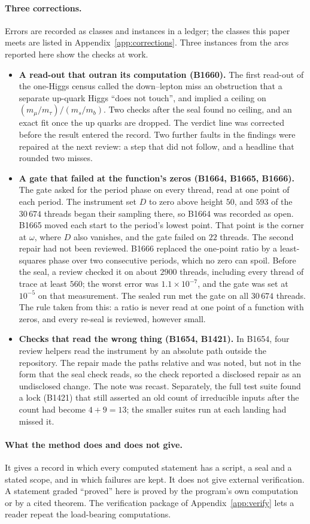 \paragraph{Three corrections.}
Errors are recorded as classes and instances in a ledger; the classes this paper meets are listed in
Appendix~\ref{app:corrections}. Three instances from the arcs reported here show the checks at work.
\begin{itemize}
\item \textbf{A read-out that outran its computation (B1660).} The first read-out of the one-Higgs census called the
  down--lepton miss an obstruction that a separate up-quark Higgs ``does not touch'', and implied a ceiling on
  $(m_\mu/m_\tau)/(m_s/m_b)$. Two checks after the seal found no ceiling, and an exact fit once the up quarks are
  dropped. The verdict line was corrected before the result entered the record. Two further faults in the findings
  were repaired at the next review: a step that did not follow, and a headline that rounded two misses.
\item \textbf{A gate that failed at the function's zeros (B1664, B1665, B1666).} The gate asked for the period phase on
  every thread, read at one point of each period. The instrument set $D$ to zero above height $50$, and $593$ of the
  $30\,674$ threads began their sampling there, so B1664 was recorded as open. B1665 moved each start to the period's
  lowest point. That point is the corner at $\omega$, where $D$ also vanishes, and the gate failed on $22$ threads. The
  second repair had not been reviewed. B1666 replaced the one-point ratio by a least-squares phase over two consecutive
  periods, which no zero can spoil. Before the seal, a review checked it on about $2900$ threads, including every
  thread of trace at least $560$; the worst error was $1.1\times10^{-7}$, and the gate was set at $10^{-5}$ on that
  measurement. The sealed run met the gate on all $30\,674$ threads. The rule taken from this: a ratio is never read at
  one point of a function with zeros, and every re-seal is reviewed, however small.
\item \textbf{Checks that read the wrong thing (B1654, B1421).} In B1654, four review helpers read the instrument by an
  absolute path outside the repository. The repair made the paths relative and was noted, but not in the form that
  the seal check reads, so the check reported a disclosed repair as an undisclosed change. The note was recast. Separately, the
  full test suite found a lock (B1421) that still asserted an old count of irreducible inputs after the count had
  become $4+9=13$; the smaller suites run at each landing had missed it.
\end{itemize}

\paragraph{What the method does and does not give.}
It gives a record in which every computed statement has a script, a seal and a stated scope, and in which failures are
kept. It does not give external verification. A statement graded ``proved'' here is proved by the program's own
computation or by a cited theorem. The verification package of Appendix~\ref{app:verify} lets a reader repeat the
load-bearing computations.
